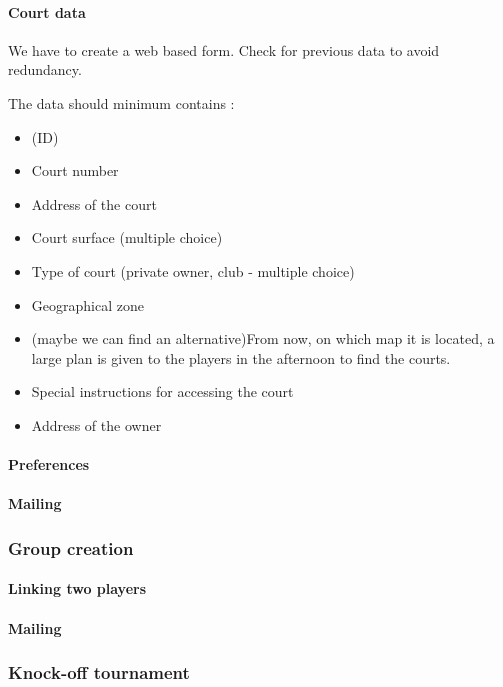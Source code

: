 \paragraph{Court data}

We have to create a web based form. Check for previous data to avoid
redundancy.

The data should minimum contains :

\begin{itemize}
    \item (ID)
    \item Court number
    \item Address of the court
    \item Court surface (multiple choice)
    \item Type of court (private owner, club - multiple choice)
    \item Geographical zone
    \item (maybe we can find an alternative)From now, on which map it is
        located, a large plan is given to the players in the afternoon
        to find the courts.
    \item Special instructions for accessing the court
    \item Address of the owner
\end{itemize}

\paragraph{Preferences}
\paragraph{Mailing}

\subsubsection{Group creation}

\paragraph{Linking two players}
\paragraph{Mailing}

\subsubsection{Knock-off tournament}
